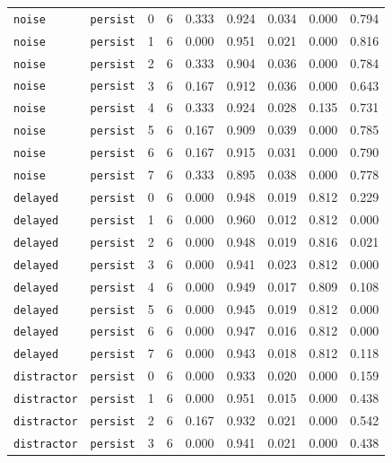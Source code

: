 \documentclass{article}
\begin{document}
\begin{center}
\begin{tabular}{lllcccccc}
\texttt{noise} & \texttt{persist} & 0 & 6 & 0.333 & 0.924 & 0.034 & 0.000 & 0.794 \\
\texttt{noise} & \texttt{persist} & 1 & 6 & 0.000 & 0.951 & 0.021 & 0.000 & 0.816 \\
\texttt{noise} & \texttt{persist} & 2 & 6 & 0.333 & 0.904 & 0.036 & 0.000 & 0.784 \\
\texttt{noise} & \texttt{persist} & 3 & 6 & 0.167 & 0.912 & 0.036 & 0.000 & 0.643 \\
\texttt{noise} & \texttt{persist} & 4 & 6 & 0.333 & 0.924 & 0.028 & 0.135 & 0.731 \\
\texttt{noise} & \texttt{persist} & 5 & 6 & 0.167 & 0.909 & 0.039 & 0.000 & 0.785 \\
\texttt{noise} & \texttt{persist} & 6 & 6 & 0.167 & 0.915 & 0.031 & 0.000 & 0.790 \\
\texttt{noise} & \texttt{persist} & 7 & 6 & 0.333 & 0.895 & 0.038 & 0.000 & 0.778 \\
\texttt{delayed} & \texttt{persist} & 0 & 6 & 0.000 & 0.948 & 0.019 & 0.812 & 0.229 \\
\texttt{delayed} & \texttt{persist} & 1 & 6 & 0.000 & 0.960 & 0.012 & 0.812 & 0.000 \\
\texttt{delayed} & \texttt{persist} & 2 & 6 & 0.000 & 0.948 & 0.019 & 0.816 & 0.021 \\
\texttt{delayed} & \texttt{persist} & 3 & 6 & 0.000 & 0.941 & 0.023 & 0.812 & 0.000 \\
\texttt{delayed} & \texttt{persist} & 4 & 6 & 0.000 & 0.949 & 0.017 & 0.809 & 0.108 \\
\texttt{delayed} & \texttt{persist} & 5 & 6 & 0.000 & 0.945 & 0.019 & 0.812 & 0.000 \\
\texttt{delayed} & \texttt{persist} & 6 & 6 & 0.000 & 0.947 & 0.016 & 0.812 & 0.000 \\
\texttt{delayed} & \texttt{persist} & 7 & 6 & 0.000 & 0.943 & 0.018 & 0.812 & 0.118 \\
\texttt{distractor} & \texttt{persist} & 0 & 6 & 0.000 & 0.933 & 0.020 & 0.000 & 0.159 \\
\texttt{distractor} & \texttt{persist} & 1 & 6 & 0.000 & 0.951 & 0.015 & 0.000 & 0.438 \\
\texttt{distractor} & \texttt{persist} & 2 & 6 & 0.167 & 0.932 & 0.021 & 0.000 & 0.542 \\
\texttt{distractor} & \texttt{persist} & 3 & 6 & 0.000 & 0.941 & 0.021 & 0.000 & 0.438 \\
\bottomrule
\end{tabular}
\end{center}
\end{document}
